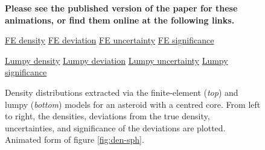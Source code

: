 \begin{figure}
  \textbf{Please see the published version of the paper for these animations, or find them online at the following links.}

  \href{https://github.com/jack-dinsmore/asteroid-tidal-torque/tree/main/paper/gifs/sph-3-fe-d.gif}{FE density} \hfill
  \href{https://github.com/jack-dinsmore/asteroid-tidal-torque/tree/main/paper/gifs/sph-3-fe-s.gif}{FE deviation} \hfill
  \href{https://github.com/jack-dinsmore/asteroid-tidal-torque/tree/main/paper/gifs/sph-3-fe-u.gif}{FE uncertainty} \hfill
  \href{https://github.com/jack-dinsmore/asteroid-tidal-torque/tree/main/paper/gifs/sph-3-fe-r.gif}{FE significance}

  \href{https://github.com/jack-dinsmore/asteroid-tidal-torque/tree/main/paper/gifs/sph-3-l-d.gif}{Lumpy density} \hfill
  \href{https://github.com/jack-dinsmore/asteroid-tidal-torque/tree/main/paper/gifs/sph-3-l-s.gif}{Lumpy deviation} \hfill
  \href{https://github.com/jack-dinsmore/asteroid-tidal-torque/tree/main/paper/gifs/sph-3-l-u.gif}{Lumpy uncertainty} \hfill
  \href{https://github.com/jack-dinsmore/asteroid-tidal-torque/tree/main/paper/gifs/sph-3-l-r.gif}{Lumpy significance}

  \caption{Density distributions extracted via the finite-element (\textit{top}) and lumpy (\textit{bottom}) models for an asteroid with a centred core. From left to right, the densities, deviations from the true density, uncertainties, and significance of the deviations are plotted. Animated form of figure \ref{fig:den-sph}.}
  \label{fig:animated-sph}
\end{figure}

